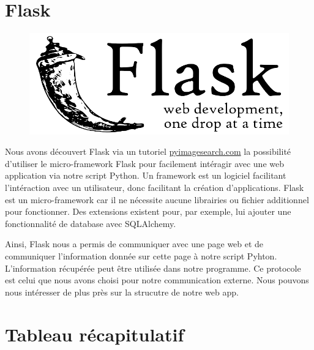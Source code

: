 \documentclass[
	a4paper,									%
	11pt,										%
	twoside,									%
	openright,									%
	notitlepage,									%
	parskip=half,								%
]{scrreprt}										%
\begin{document}
\newpage
\section{Flask}

\begin{figure}[!ht]
	\centering
	\includegraphics[scale=.2]{img/Flask.png}
	\vspace{.5cm}
	\label{Flask}
\end{figure}

Nous avons découvert Flask via un tutoriel \href{https://pyimagesearch.com/2019/09/02/opencv-stream-video-to-web-browser-html-page/}{pyimagesearch.com}
la possibilité d'utiliser le micro-framework Flask pour facilement intéragir avec une web application via notre script Python.
Un framework est un logiciel facilitant l'intéraction avec un utilisateur, donc facilitant la création d'applications. 
Flask est un micro-framework car il ne nécessite aucune librairies ou fichier additionnel pour fonctionner. Des extensions
existent pour, par exemple, lui ajouter une fonctionnalité de database avec SQLAlchemy. \par

Ainsi, Flask nous a permis de communiquer avec une page web et de communiquer l'information donnée sur cette page 
à notre script Pyhton. L'information récupérée peut être utilisée dans notre programme. 
Ce protocole est celui que nous avons choisi pour notre communication externe. Nous pouvons nous intéresser de plus 
près sur la strucutre de notre web app. \par

\section{Tableau récapitulatif}
\end{document}

